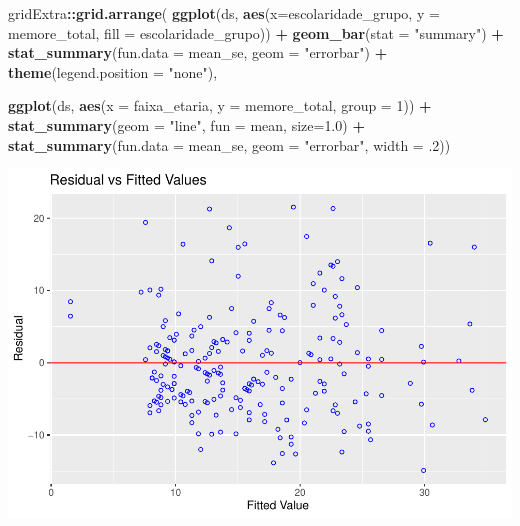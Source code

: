\documentclass[
]{book}
\newenvironment{Shaded}{\begin{snugshade}}{\end{snugshade}}
\newcommand{\DataTypeTok}[1]{\textcolor[rgb]{0.13,0.29,0.53}{#1}}
\newcommand{\DecValTok}[1]{\textcolor[rgb]{0.00,0.00,0.81}{#1}}
\newcommand{\FloatTok}[1]{\textcolor[rgb]{0.00,0.00,0.81}{#1}}
\newcommand{\KeywordTok}[1]{\textcolor[rgb]{0.13,0.29,0.53}{\textbf{#1}}}
\newcommand{\NormalTok}[1]{#1}
\newcommand{\OperatorTok}[1]{\textcolor[rgb]{0.81,0.36,0.00}{\textbf{#1}}}
\newcommand{\StringTok}[1]{\textcolor[rgb]{0.31,0.60,0.02}{#1}}
\begin{document}
\begin{Shaded}
\begin{Highlighting}[]
\NormalTok{gridExtra}\OperatorTok{::}\KeywordTok{grid.arrange}\NormalTok{(}
  \KeywordTok{ggplot}\NormalTok{(ds, }\KeywordTok{aes}\NormalTok{(}\DataTypeTok{x=}\NormalTok{escolaridade_grupo, }\DataTypeTok{y =}\NormalTok{ memore_total, }\DataTypeTok{fill =}\NormalTok{ escolaridade_grupo)) }\OperatorTok{+}
\StringTok{    }\KeywordTok{geom_bar}\NormalTok{(}\DataTypeTok{stat =} \StringTok{"summary"}\NormalTok{) }\OperatorTok{+}
\StringTok{    }\KeywordTok{stat_summary}\NormalTok{(}\DataTypeTok{fun.data =}\NormalTok{ mean_se, }\DataTypeTok{geom =} \StringTok{"errorbar"}\NormalTok{) }\OperatorTok{+}
\StringTok{    }\KeywordTok{theme}\NormalTok{(}\DataTypeTok{legend.position =} \StringTok{"none"}\NormalTok{),}
  
  \KeywordTok{ggplot}\NormalTok{(ds, }\KeywordTok{aes}\NormalTok{(}\DataTypeTok{x =}\NormalTok{ faixa_etaria, }\DataTypeTok{y =}\NormalTok{ memore_total, }\DataTypeTok{group =} \DecValTok{1}\NormalTok{)) }\OperatorTok{+}
\StringTok{  }\KeywordTok{stat_summary}\NormalTok{(}\DataTypeTok{geom =} \StringTok{"line"}\NormalTok{, }\DataTypeTok{fun =}\NormalTok{ mean, }\DataTypeTok{size=}\FloatTok{1.0}\NormalTok{) }\OperatorTok{+}
\StringTok{  }\KeywordTok{stat_summary}\NormalTok{(}\DataTypeTok{fun.data =}\NormalTok{ mean_se, }\DataTypeTok{geom =} \StringTok{"errorbar"}\NormalTok{, }\DataTypeTok{width =} \FloatTok{.2}\NormalTok{))}
\end{Highlighting}
\end{Shaded}

\begin{center}\includegraphics{gitbook-demo_files/figure-latex/unnamed-chunk-108-1} \end{center}
\end{document}
